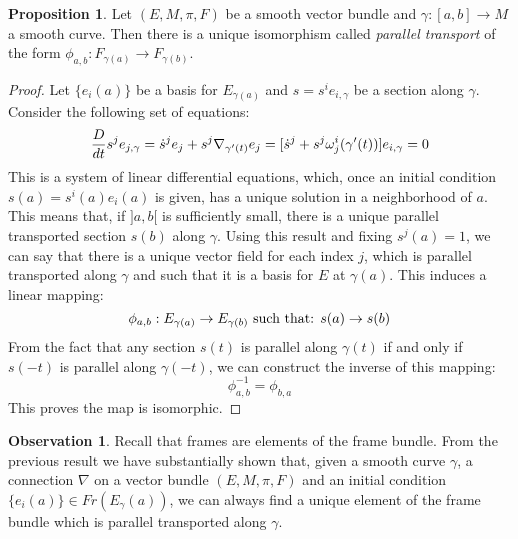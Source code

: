 \documentclass[12pt,a4paper]{report}
\theoremstyle{definition}
\theoremstyle{Theorem}
\newtheorem{Prop}[Def]{Proposition}
\theoremstyle{definition}
\theoremstyle{definition}
\newtheorem{Obs}[Def]{Observation}
\begin{document}
	\begin{Prop}
		Let $(E,M,\pi,F)$ be a smooth vector bundle and $\gamma:[a,b]\rightarrow M$ a smooth curve. Then there is a unique isomorphism called \textit{parallel transport} of the form $\phi_{a,b}:F_{\gamma(a)}\rightarrow F_{\gamma(b)}$.
	\end{Prop}
	\begin{proof}
		Let $\{e_i(a)\}$ be a basis for $E_{\gamma(a)}$ and $s=s^ie_{i,\gamma}$ be a section along $\gamma$. Consider the following set of equations:
		$${D\over dt}{s^je_{j,\gamma}}=\dot{s}^je_j+s^j\nabla_{\gamma'(t)}e_j=[\dot{s}^j+s^j\omega^i_j(\gamma'(t))]e_{i,\gamma}=0$$
		This is a system of linear differential equations, which, once an initial condition $s(a)=s^i(a)e_i(a)$ is given, has a unique solution in a neighborhood of $a$.  This means that, if $]a,b[$ is sufficiently small, there is a unique parallel transported section $s(b)$ along $\gamma$. Using this result and fixing $s^j(a)=1$, we can say that there is a unique vector field for each index $j$, which is parallel transported along $\gamma$ and such that it is a basis for $E$ at $\gamma(a)$. This induces a linear mapping:
		$$\phi_{a,b}:E_{\gamma(a)}\rightarrow E_{\gamma(b)}\hbox{ such that: } s(a)\rightarrow s(b)$$
		From the fact that any section $s(t)$ is parallel along $\gamma(t)$ if and only if $s(-t)$ is parallel along $\gamma(-t)$, we can construct the inverse of this mapping:
		$$\phi^{-1}_{a,b}=\phi_{b,a}$$
		This proves the map is isomorphic.
	\end{proof}
	\begin{Obs}
		Recall that frames are elements of the frame bundle. From the previous result we have substantially shown that, given a smooth curve $\gamma$, a connection $\nabla$ on a vector bundle $(E,M,\pi,F)$ and an initial condition $\{e_i(a)\}\in Fr(E_\gamma(a))$, we can always find a unique element of the frame bundle which is parallel transported along $\gamma$.
	\end{Obs}
	\begin{comment}
		We now look at the notion of parallel transport on the tangent bundle of a manifold.
		\section{The parallel transport on the tangent bundle}
		In this section we will use the previous results to study the notion of parallel transport on the tangent bundle of a smooth manifold. More information on this topic can be found in [2] chap.3 pag. 95-102.
	\end{comment}
\end{document}
